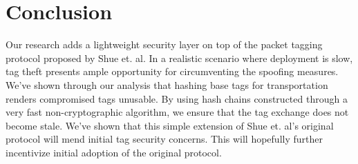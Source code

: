 \documentclass[12pt]{article} %
\begin{document}
\section{Conclusion}

Our research adds a lightweight security layer on top of the packet tagging protocol proposed by Shue et. al. In a realistic scenario where deployment is slow, tag theft presents ample opportunity for circumventing the spoofing measures. We've shown through our analysis that hashing base tags for transportation renders compromised tags unusable. By using hash chains constructed through a very fast non-cryptographic algorithm, we ensure that the tag exchange does not become stale. We've shown that this simple extension of Shue et. al's original protocol will mend initial tag security concerns. This will hopefully further incentivize initial adoption of the original protocol.








\end{document}
